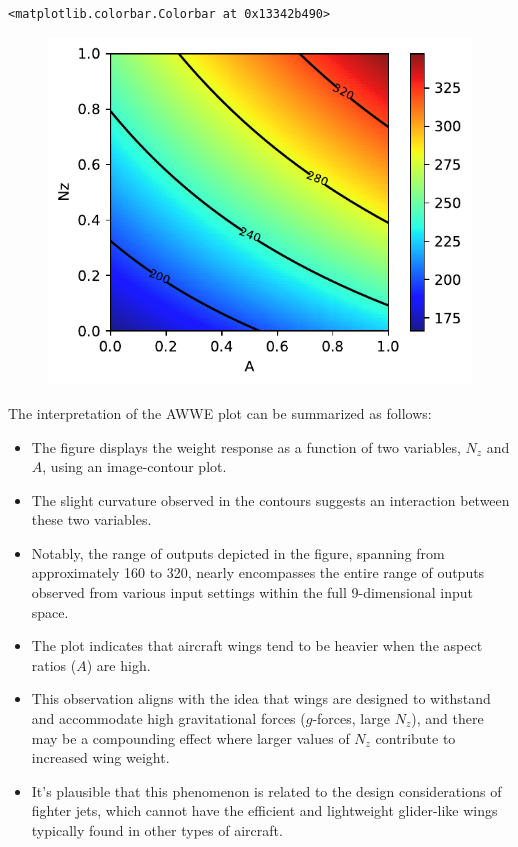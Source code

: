 \documentclass[
  letterpaper,
  DIV=11,
  numbers=noendperiod]{scrreprt}
\providecommand{\tightlist}{%
  \setlength{\itemsep}{0pt}\setlength{\parskip}{0pt}}\usepackage{longtable,booktabs,array}
\begin{document}
\begin{verbatim}
<matplotlib.colorbar.Colorbar at 0x13342b490>
\end{verbatim}

\begin{figure}[H]

{\centering \includegraphics{002_awwe_files/figure-pdf/cell-6-output-2.pdf}

}

\end{figure}

The interpretation of the AWWE plot can be summarized as follows:

\begin{itemize}
\tightlist
\item
  The figure displays the weight response as a function of two
  variables, \(N_z\) and \(A\), using an image-contour plot.
\item
  The slight curvature observed in the contours suggests an interaction
  between these two variables.
\item
  Notably, the range of outputs depicted in the figure, spanning from
  approximately 160 to 320, nearly encompasses the entire range of
  outputs observed from various input settings within the full
  9-dimensional input space.
\item
  The plot indicates that aircraft wings tend to be heavier when the
  aspect ratios (\(A\)) are high.
\item
  This observation aligns with the idea that wings are designed to
  withstand and accommodate high gravitational forces (\(g\)-forces,
  large \(N_z\)), and there may be a compounding effect where larger
  values of \(N_z\) contribute to increased wing weight.
\item
  It's plausible that this phenomenon is related to the design
  considerations of fighter jets, which cannot have the efficient and
  lightweight glider-like wings typically found in other types of
  aircraft.
\end{itemize}
\end{document}
